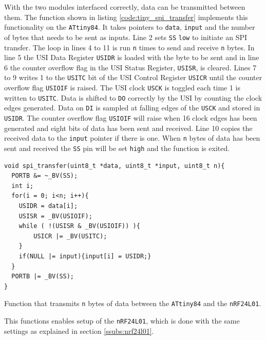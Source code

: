 {With the two modules interfaced correctly, data can be transmitted between them.
The function shown in listing \ref{code:tiny_spi_transfer} implements this functionality on the \texttt{ATtiny84}.
It takes pointers to \texttt{data}, \texttt{input} and the number of bytes that needs to be sent as inputs.
Line 2 sets \texttt{SS} \texttt{low} to initiate an SPI transfer.
The loop in lines 4 to 11 is run \texttt{n} times to send and receive \texttt{n} bytes.
In line 5 the USI Data Register \texttt{USIDR} is loaded with the byte to be sent and in line 6 the counter overflow flag in the USI Status Register, \texttt{USISR}, is cleared.
Lines 7 to 9 writes 1 to the \texttt{USITC} bit of the USI Control Register \texttt{USICR} until the counter overflow flag \texttt{USIOIF} is raised.
The USI clock \texttt{USCK} is toggled each time 1 is written to \texttt{USITC}.
Data is shifted to \texttt{DO} correctly by the USI by counting the clock edges generated. 
Data on \texttt{DI} is sampled at falling edges of the \texttt{USCK} and stored in \texttt{USIDR}.
The counter overflow flag \texttt{USIOIF} will raise when 16 clock edges has been generated and eight bits of data has been sent and received.
Line 10 copies the received data to the \texttt{input} pointer if there is one.
When \texttt{n} bytes of data has been sent and received the \texttt{SS} pin will be set \texttt{high} and the function is exited.
\begin{listing}[h] 
\begin{verbatim}
void spi_transfer(uint8_t *data, uint8_t *input, uint8_t n){
  PORTB &= ~_BV(SS);
  int i;
  for(i = 0; i<n; i++){
	USIDR = data[i];
	USISR = _BV(USIOIF);  
	while ( !(USISR & _BV(USIOIF)) ){
		USICR |= _BV(USITC);  
	} 
	if(NULL |= input){input[i] = USIDR;}
  }
  PORTB |= _BV(SS);
}
\end{verbatim}
\caption{Function that transmits \texttt{n} bytes of data between the \texttt{ATtiny84} and the \texttt{nRF24L01}.}
\label{code:tiny_spi_transfer}
\end{listing}

This functions enables setup of the \texttt{nRF24L01}, which is done with the same settings as explained in section \ref{ssubs:nrf24l01}.

}

